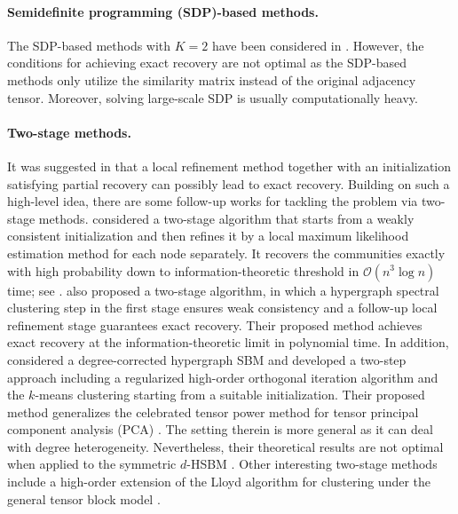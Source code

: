 \documentclass{article}
\theoremstyle{plain}
\theoremstyle{definition}
\theoremstyle{remark}
\newcommand{\OCal}{\mathcal{O}}
\begin{document}
\paragraph{Semidefinite programming (SDP)-based methods.} 
The SDP-based methods with $K=2$ have been considered in \citet{kim2018stochastic,gaudio2022community}. However, the conditions for achieving exact recovery are not optimal as the SDP-based methods only utilize the similarity matrix instead of the original adjacency tensor. Moreover, solving large-scale SDP is usually computationally heavy. 
\vspace{-0.3cm}
\paragraph{Two-stage methods.} It was suggested in \citet{abbe2017community,kim2018stochastic} that a local refinement method together with an initialization satisfying partial recovery can possibly lead to exact recovery. Building on such a high-level idea, there are some follow-up works for tackling the problem via two-stage methods. \citet{chien2019minimax} considered a two-stage algorithm that starts from a weakly consistent initialization and then refines it by a local maximum likelihood estimation method for each node separately. It recovers the communities exactly with high probability down
to information-theoretic threshold in $\OCal(n^3 \log n)$ time; see \citet[Section \uppercase\expandafter{}.C]{chien2019minimax}. \citet{zhang2022exact} also proposed a two-stage algorithm, in which a hypergraph spectral clustering step in the first stage ensures weak consistency and a follow-up local refinement stage guarantees exact recovery. Their proposed method achieves exact recovery at the information-theoretic limit in polynomial time. In addition, \citet{ke2019community} considered a degree-corrected hypergraph SBM and developed a two-step approach including a regularized high-order orthogonal iteration algorithm and the $k$-means clustering starting from a suitable initialization. Their proposed method generalizes the celebrated tensor power method for tensor principal component analysis (PCA) \citep{richard2014statistical,huang2022power}. The setting therein is more general as it can deal with degree heterogeneity. Nevertheless, their theoretical results are not optimal when applied to the symmetric $d$-HSBM \citep[Corollary 1]{ke2019community}. Other interesting two-stage methods include a high-order extension of the Lloyd algorithm for clustering under the general tensor block model \citep{han2022exact}.
\end{document}
